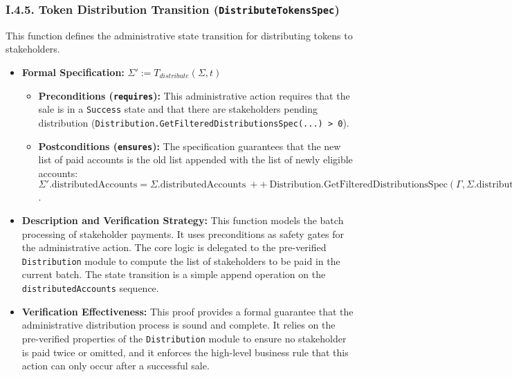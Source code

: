 \documentclass[
  english,
  onecolumn]{article}
\providecommand{\tightlist}{%
  \setlength{\itemsep}{0pt}\setlength{\parskip}{0pt}}
\begin{document}
\subsubsection{\texorpdfstring{I.4.5. Token Distribution Transition
(\texttt{DistributeTokensSpec})}{I.4.5. Token Distribution Transition (DistributeTokensSpec)}}\label{i.4.5.-token-distribution-transition-distributetokensspec}

This function defines the administrative state transition for
distributing tokens to stakeholders.

\begin{itemize}
\tightlist
\item
  \textbf{Formal Specification:}
  \(\Sigma' := T_{distribute}(\Sigma, t)\)

  \begin{itemize}
  \tightlist
  \item
    \textbf{Preconditions (\texttt{requires}):} This administrative
    action requires that the sale is in a \texttt{Success} state and
    that there are stakeholders pending distribution
    (\texttt{\textbar{}Distribution.GetFilteredDistributionsSpec(...)\ \textgreater{}\ 0}).
  \item
    \textbf{Postconditions (\texttt{ensures}):} The specification
    guarantees that the new list of paid accounts is the old list
    appended with the list of newly eligible accounts:
    \(\Sigma'.\text{distributedAccounts} = \Sigma.\text{distributedAccounts} \ ++ \ \text{Distribution.GetFilteredDistributionsSpec}(\Gamma, \Sigma.\text{distributedAccounts})\).
  \end{itemize}
\item
  \textbf{Description and Verification Strategy:} This function models
  the batch processing of stakeholder payments. It uses preconditions as
  safety gates for the administrative action. The core logic is
  delegated to the pre-verified \texttt{Distribution} module to compute
  the list of stakeholders to be paid in the current batch. The state
  transition is a simple append operation on the
  \texttt{distributedAccounts} sequence.
\item
  \textbf{Verification Effectiveness:} This proof provides a formal
  guarantee that the administrative distribution process is sound and
  complete. It relies on the pre-verified properties of the
  \texttt{Distribution} module to ensure no stakeholder is paid twice or
  omitted, and it enforces the high-level business rule that this action
  can only occur after a successful sale.
\end{itemize}
\end{document}
